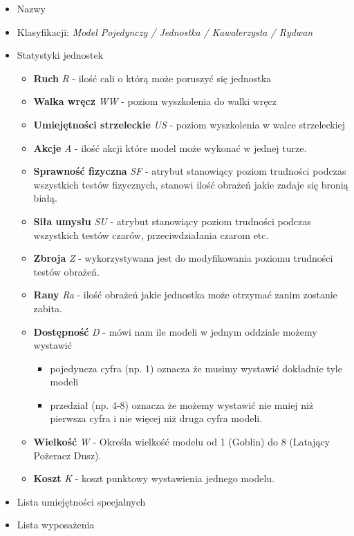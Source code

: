 \begin{itemize}
    \item Nazwy
    \item Klasyfikacji: \textit{Model Pojedynczy / Jednostka / Kawalerzysta / Rydwan}
    \item Statystyki jednostek
    \begin{itemize}
    	\item \textbf{Ruch} \textit{R}  \label{sec:link_jednostki_R} - ilość cali o którą może poruszyć się jednostka 
    	\item \textbf{Walka wręcz} \textit{WW}  \label{sec:link_jednostki_WW} - poziom wyszkolenia do walki wręcz
    	\item \textbf{Umiejętności strzeleckie} \textit{US}  \label{sec:link_jednostki_US} - poziom wyszkolenia w walce strzeleckiej
    	\item \textbf{Akcje}  \textit{A}  \label{sec:link_jednostki_A} - ilość akcji które model może wykonać w jednej turze.
    	\item \textbf{Sprawność fizyczna} \textit{SF}  \label{sec:link_jednostki_SF} - atrybut stanowiący poziom trudności podczas wszystkich testów fizycznych, stanowi ilość obrażeń jakie zadaje się bronią białą. 
    	\item \textbf{Siła umysłu}  \textit{SU}  \label{sec:link_jednostki_SU} - atrybut  stanowiący poziom trudności podczas wszystkich testów czarów, przeciwdziałania czarom etc.
    	\item \textbf{Zbroja}  \textit{Z}  \label{sec:link_jednostki_Z} - wykorzystywana jest do modyfikowania poziomu trudności testów obrażeń. 
    	\item \textbf{Rany}  \textit{Ra}  \label{sec:link_jednostki_Ra} - ilość obrażeń jakie jednostka może otrzymać zanim zostanie zabita. 
    	\item \textbf{Dostępność}  \textit{D}  \label{sec:link_jednostki_D} - mówi nam ile modeli w jednym oddziale możemy wystawić
    	    \begin{itemize}
    	        \item pojedyncza cyfra (np. 1) oznacza że musimy wystawić dokładnie tyle modeli
    	        \item przedział (np. 4-8) oznacza że możemy wystawić nie mniej niż pierwsza cyfra i nie więcej niż druga cyfra modeli. 
    	    \end{itemize}
    	\item \textbf{Wielkość} \textit{W}  \label{sec:link_jednostki_W} - Określa wielkość modelu od 1 (Goblin) do 8 (Latający Pożeracz Dusz).
    	\item \textbf{Koszt}  \textit{K}  \label{sec:link_jednostki_W} - koszt punktowy wystawienia jednego modelu. 
    \end{itemize} 
    \item Lista umiejętności specjalnych
    \item Lista wyposażenia 
\end{itemize}

